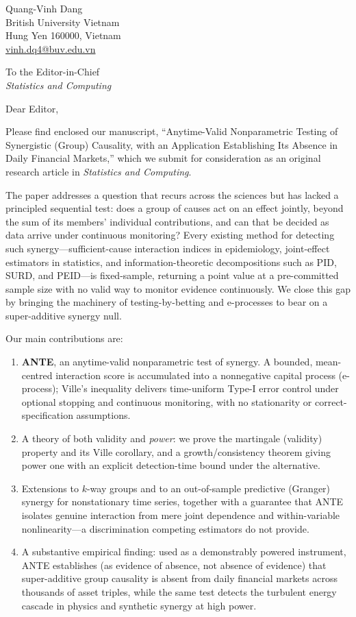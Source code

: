 \documentclass[11pt]{article}
\begin{document}
\noindent
Quang-Vinh Dang\\
British University Vietnam\\
Hung Yen 160000, Vietnam\\
\href{mailto:vinh.dq4@buv.edu.vn}{vinh.dq4@buv.edu.vn}

\medskip
\noindent
To the Editor-in-Chief\\
\textit{Statistics and Computing}

\medskip
\noindent Dear Editor,

Please find enclosed our manuscript, ``Anytime-Valid Nonparametric Testing of
Synergistic (Group) Causality, with an Application Establishing Its Absence in
Daily Financial Markets,'' which we submit for consideration as an original
research article in \textit{Statistics and Computing}.

The paper addresses a question that recurs across the sciences but has lacked a
principled sequential test: does a group of causes act on an effect jointly,
beyond the sum of its members' individual contributions, and can that be decided
as data arrive under continuous monitoring? Every existing method for detecting
such synergy---sufficient-cause interaction indices in epidemiology, joint-effect
estimators in statistics, and information-theoretic decompositions such as PID,
SURD, and PEID---is fixed-sample, returning a point value at a pre-committed
sample size with no valid way to monitor evidence continuously. We close this gap
by bringing the machinery of testing-by-betting and e-processes to bear on a
super-additive synergy null.

Our main contributions are:

\begin{enumerate}
\item \textbf{ANTE}, an anytime-valid nonparametric test of synergy. A bounded,
mean-centred interaction score is accumulated into a nonnegative capital process
(e-process); Ville's inequality delivers time-uniform Type-I error control under
optional stopping and continuous monitoring, with no stationarity or
correct-specification assumptions.

\item A theory of both validity and \emph{power}: we prove the martingale
(validity) property and its Ville corollary, and a growth/consistency theorem
giving power one with an explicit detection-time bound under the alternative.

\item Extensions to $k$-way groups and to an out-of-sample predictive (Granger)
synergy for nonstationary time series, together with a guarantee that ANTE
isolates genuine interaction from mere joint dependence and within-variable
nonlinearity---a discrimination competing estimators do not provide.

\item A substantive empirical finding: used as a demonstrably powered instrument,
ANTE establishes (as evidence of absence, not absence of evidence) that
super-additive group causality is absent from daily financial markets across
thousands of asset triples, while the same test detects the turbulent energy
cascade in physics and synthetic synergy at high power.
\end{enumerate}
\end{document}
